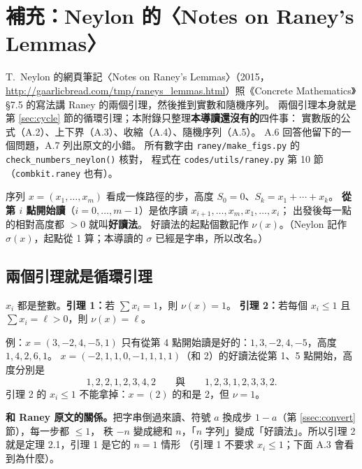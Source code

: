 \section{補充：Neylon 的〈Notes on Raney's Lemmas〉}\label{sec:neylon}

T.~Neylon 的網頁筆記〈Notes on Raney's Lemmas〉（2015，\url{http://gaarlicbread.com/tmp/raneys_lemmas.html}）照《Concrete Mathematics》§7.5 的寫法講 Raney 的兩個引理，然後推到實數和隨機序列。
兩個引理本身就是第 \ref{sec:cycle} 節的循環引理；本附錄只整理\textbf{本導讀還沒有的}四件事：
實數版的公式（A.2）、上下界（A.3）、收縮（A.4）、隨機序列（A.5）。
A.6 回答他留下的一個問題，A.7 列出原文的小錯。
所有數字由 \texttt{raney/make\_figs.py} 的 \texttt{check\_numbers\_neylon()} 核對，
程式在 \texttt{codes/utils/raney.py} 第 10 節（\texttt{combkit.raney} 也有）\extra。

\begin{keybox}[本附錄的記號]
序列 $x=(x_1,\ldots,x_m)$ 看成一條路徑的步，高度 $S_0=0$、$S_k=x_1+\cdots+x_k$。
\textbf{從第 $i$ 點開始讀}（$i=0,\ldots,m-1$）是依序讀 $x_{i+1},\ldots,x_m,x_1,\ldots,x_i$；
出發後每一點的相對高度都 $>0$ 就叫\textbf{好讀法}。
好讀法的起點個數記作 $\nu(x)$。（Neylon 記作 $\sigma(x)$，起點從 1 算；本導讀的 $\sigma$ 已經是字串，所以改名。）
\end{keybox}

\subsection{兩個引理就是循環引理}

\begin{thmbox}
$x_i$ 都是整數。\textbf{引理 1：}若 $\sum x_i=1$，則 $\nu(x)=1$。
\textbf{引理 2：}若每個 $x_i\le1$ 且 $\sum x_i=\ell>0$，則 $\nu(x)=\ell$。
\end{thmbox}

例：$x=(3,-2,4,-5,1)$ 只有從第 4 點開始讀是好的：$1,3,-2,4,-5$，高度 $1,4,2,6,1$。
$x=(-2,1,1,0,-1,1,1,1)$（和 2）的好讀法從第 1、5 點開始，高度分別是
\[
1,2,2,1,2,3,4,2\qquad\text{與}\qquad 1,2,3,1,2,3,3,2 .
\]
引理 2 的 $x_i\le1$ 不能拿掉：$x=(2)$ 的和是 2，但 $\nu=1$。

\textbf{和 Raney 原文的關係。}把字串倒過來讀、符號 $a$ 換成步 $1-a$（第 \ref{ssec:convert} 節），每一步都 $\le1$，
秩 $-n$ 變成總和 $n$，「$n$ 字列」變成「好讀法」。所以引理 2 就是定理 2.1，引理 1 是它的 $n=1$ 情形
（引理 1 不要求 $x_i\le1$；下面 A.3 會看到為什麼）。

